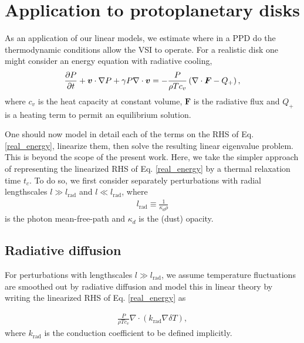 \section{Application to protoplanetary disks}\label{application} 
As an application of our linear models, we estimate where in a
PPD do the thermodynamic conditions allow the VSI to
operate. For a realistic disk one might consider an energy equation
with radiative cooling, 
\begin{align}\label{real_energy}
  \frac{\partial P}{\partial t} + \bm{v}\cdot\nabla P +\gamma P \nabla\cdot\bm{v} = - \frac{P}{\rho T
    c_v}\left(\nabla\cdot\bm{F} - Q_+\right), 
\end{align}
where $c_v$ is the heat capacity at constant
volume, 
$\bm{F}$ is the radiative flux and $Q_+$ is a heating
term to permit an equilibrium solution. 

One should now model in detail each of the terms on the RHS of
Eq. \ref{real_energy}, linearize them, then solve 
the resulting linear eigenvalue problem. This is beyond 
the scope of the present work. Here, we take the simpler approach of
representing the linearized RHS of Eq. \ref{real_energy} by a thermal
relaxation time $t_c$. To do so, we first consider separately
perturbations with radial lengthscales $l\gg l_\mathrm{rad}$ and  
$l\ll l_\mathrm{rad}$, where      
\begin{align}\label{lrad}
  l_\mathrm{rad} \equiv \frac{1}{\kappa_d\rho} 
\end{align} 
is the photon mean-free-path and $\kappa_d$ is the (dust) opacity. 

\subsection{Radiative diffusion}
For perturbations with lengthscales $l\gg
l_\mathrm{rad}$, we assume temperature fluctuations are smoothed out
by radiative diffusion and model this in linear theory by writing the
linearized RHS of Eq. \ref{real_energy} as 

\begin{align}\label{diff_cool_proper}
  \frac{P}{\rho T c_v} \nabla\cdot\left(k_\mathrm{rad}\nabla\delta
    T\right),  
\end{align}
where $k_\mathrm{rad}$ is the conduction coefficient to be defined
implicitly. 

